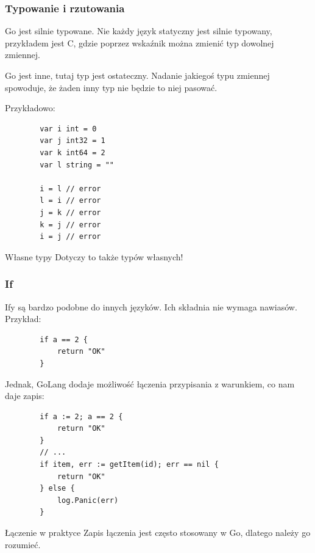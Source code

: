 \documentclass[10pt]{beamer}
\begin{document}
\begin{frame}[fragile]
    \frametitle{Typowanie i rzutowania}
    Go jest silnie typowane. Nie każdy język statyczny jest silnie typowany,
    przykładem jest C, gdzie poprzez wskaźnik można zmienić typ dowolnej zmiennej.

    Go jest inne, tutaj typ jest ostateczny. Nadanie jakiegoś typu zmiennej
    spowoduje, że żaden inny typ nie będzie to niej pasować.

    Przykładowo:
    \begin{verbatim}
        var i int = 0
        var j int32 = 1
        var k int64 = 2
        var l string = ""

        i = l // error
        l = i // error
        j = k // error
        k = j // error
        i = j // error
    \end{verbatim}

    \begin{alertblock}{Własne typy}
        Dotyczy to także typów własnych!
    \end{alertblock}
\end{frame}

\begin{frame}[fragile]
    \frametitle{If}
    Ify są bardzo podobne do innych języków. Ich składnia nie wymaga
    nawiasów. Przykład:

    \begin{verbatim}
        if a == 2 {
            return "OK"
        }
    \end{verbatim}

    Jednak, GoLang dodaje możliwość łączenia przypisania z warunkiem,
    co nam daje zapis:

    \begin{verbatim}
        if a := 2; a == 2 {
            return "OK"
        }
        // ...
        if item, err := getItem(id); err == nil {
            return "OK"
        } else {
            log.Panic(err)
        }
    \end{verbatim}

    \begin{block}{Łączenie w praktyce}
        Zapis łączenia jest często stosowany w Go, dlatego należy go 
        rozumieć.
    \end{block}
\end{frame}
\end{document}
